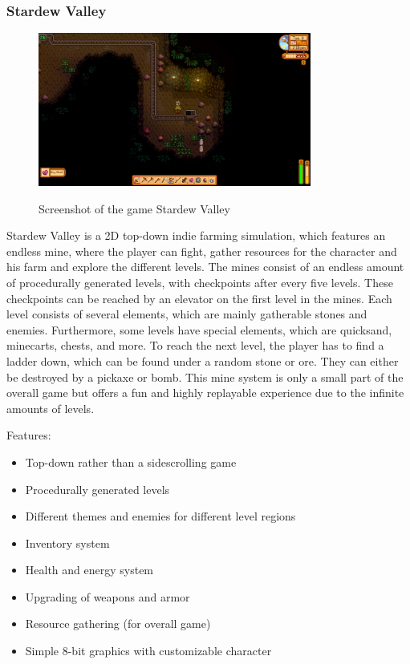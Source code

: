 \documentclass[12p]{article}
\begin{document}

\newpage
\subsubsection[Stardew Valley]{Stardew Valley \cite{StardewValley}} \label{StardewValley}

\begin{figure}[ht]
 \center
 \includegraphics[width=0.8\textwidth]{StateOfTheArtScreenshots/stardew_valley}
 \label{sec:StateOfTheArt_Screenshots_StardewValley}
 \caption{Screenshot of the game Stardew Valley \cite{StardewValleyScreenshot}}
\end{figure}

Stardew Valley is a 2D top-down indie farming simulation, which features an endless mine, where the player can fight, gather resources for the character and his farm and explore the different levels. The mines consist of an endless amount of procedurally generated levels, with checkpoints after every five levels. These checkpoints can be reached by an elevator on the first level in the mines. Each level consists of several elements, which are mainly gatherable stones and enemies. Furthermore, some levels have special elements, which are quicksand, minecarts, chests, and more. To reach the next level, the player has to find a ladder down, which can be found under a random stone or ore. They can either be destroyed by a pickaxe or bomb. This mine system is only a small part of the overall game but offers a fun and highly replayable experience due to the infinite amounts of levels.

Features:

\begin{itemize}
 \item Top-down rather than a sidescrolling game
 \item Procedurally generated levels
 \item Different themes and enemies for different level regions
 \item Inventory system
 \item Health and energy system
 \item Upgrading of weapons and armor
 \item Resource gathering (for overall game)
 \item Simple 8-bit graphics with customizable character
\end{itemize}
\end{document}
